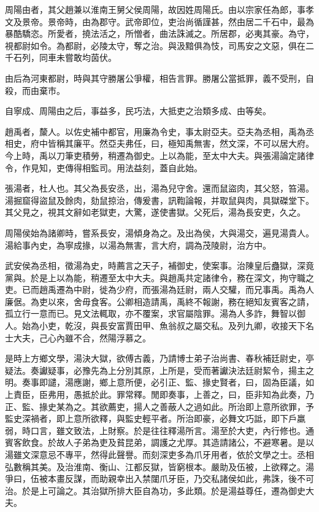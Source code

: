 周陽由者，其父趙兼以淮南王舅父侯周陽，故因姓周陽氏。由以宗家任為郎，事孝文及景帝。景帝時，由為郡守。武帝即位，吏治尚循謹甚，然由居二千石中，最為暴酷驕恣。所愛者，撓法活之，所憎者，曲法誅滅之。所居郡，必夷其豪。為守，視都尉如令。為都尉，必陵太守，奪之治。與汲黯俱為忮，司馬安之文惡，俱在二千石列，同車未嘗敢均茵伏。

由后為河東都尉，時與其守勝屠公爭權，相告言罪。勝屠公當抵罪，義不受刑，自殺，而由棄市。

自寧成、周陽由之后，事益多，民巧法，大抵吏之治類多成、由等矣。

趙禹者，斄人。以佐史補中都官，用廉為令史，事太尉亞夫。亞夫為丞相，禹為丞相史，府中皆稱其廉平。然亞夫弗任，曰，極知禹無害，然文深，不可以居大府。今上時，禹以刀筆吏積勞，稍遷為御史。上以為能，至太中大夫。與張湯論定諸律令，作見知，吏傳得相監司。用法益刻，蓋自此始。

張湯者，杜人也。其父為長安丞，出，湯為兒守舍。還而鼠盜肉，其父怒，笞湯。湯掘窟得盜鼠及餘肉，劾鼠掠治，傳爰書，訊鞫論報，并取鼠與肉，具獄磔堂下。其父見之，視其文辭如老獄吏，大驚，遂使書獄。父死后，湯為長安吏，久之。

周陽侯始為諸卿時，嘗系長安，湯傾身為之。及出為侯，大與湯交，遍見湯貴人。湯給事內史，為寧成掾，以湯為無害，言大府，調為茂陵尉，治方中。

武安侯為丞相，徵湯為史，時薦言之天子，補御史，使案事。治陳皇后蠱獄，深竟黨與。於是上以為能，稍遷至太中大夫。與趙禹共定諸律令，務在深文，拘守職之吏。已而趙禹遷為中尉，徙為少府，而張湯為廷尉，兩人交驩，而兄事禹。禹為人廉倨。為吏以來，舍毋食客。公卿相造請禹，禹終不報謝，務在絕知友賓客之請，孤立行一意而已。見文法輒取，亦不覆案，求官屬陰罪。湯為人多詐，舞智以御人。始為小吏，乾沒，與長安富賈田甲、魚翁叔之屬交私。及列九卿，收接天下名士大夫，己心內雖不合，然陽浮慕之。

是時上方鄉文學，湯決大獄，欲傅古義，乃請博士弟子治尚書、春秋補廷尉史，亭疑法。奏讞疑事，必豫先為上分別其原，上所是，受而著讞決法廷尉絜令，揚主之明。奏事即譴，湯應謝，鄉上意所便，必引正、監、掾史賢者，曰，固為臣議，如上責臣，臣弗用，愚抵於此。罪常釋。閒即奏事，上善之，曰，臣非知為此奏，乃正、監、掾史某為之。其欲薦吏，揚人之善蔽人之過如此。所治即上意所欲罪，予監史深禍者，即上意所欲釋，與監史輕平者。所治即豪，必舞文巧詆，即下戶羸弱，時口言，雖文致法，上財察。於是往往釋湯所言。湯至於大吏，內行修也。通賓客飲食。於故人子弟為吏及貧昆弟，調護之尤厚。其造請諸公，不避寒暑。是以湯雖文深意忌不專平，然得此聲譽。而刻深吏多為爪牙用者，依於文學之士。丞相弘數稱其美。及治淮南、衡山、江都反獄，皆窮根本。嚴助及伍被，上欲釋之。湯爭曰，伍被本畫反謀，而助親幸出入禁闥爪牙臣，乃交私諸侯如此，弗誅，後不可治。於是上可論之。其治獄所排大臣自為功，多此類。於是湯益尊任，遷為御史大夫。

